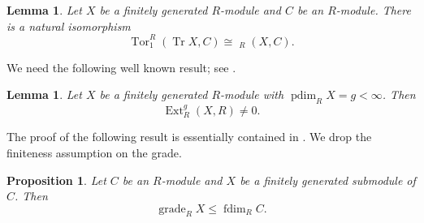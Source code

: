 \documentclass[a4paper,reqno]{amsart}
\numberwithin{equation}{section}
\theoremstyle{plain}
\newtheorem{prop}[thm]{Proposition}
\newtheorem{lem}[thm]{Lemma}
\theoremstyle{definition}
\theoremstyle{remark}
\DeclareMathOperator{\Ext}{Ext}
\DeclareMathOperator{\Tor}{Tor}
\DeclareMathOperator{\uHom}{\underline{Hom}}
\DeclareMathOperator{\grade}{grade}
\DeclareMathOperator{\pdim}{pdim}
\DeclareMathOperator{\fdim}{fdim}
\DeclareMathOperator{\Tr}{Tr}
\renewcommand{\-}{\mbox{-}}
\begin{document}
\begin{lem} \label{lem:abformula}
Let \(X\) be a finitely generated \(R\)-module and \(C\) be an \(R\)-module. 
There is a natural isomorphism
\begin{equation*}
    \Tor^R_1(\Tr X,C)\cong \uHom_R(X,C).
\end{equation*}
\end{lem}




We need the following well known result; see \cite[VI.5.5]{ARS95}.


\begin{lem} \label{lem:pdim}
    Let \(X\) be a finitely generated \(R\)-module with \(\pdim_RX=g<\infty\). Then
    \begin{equation*}
        \Ext^g_R(X,R)\neq 0.
    \end{equation*}
\end{lem}


The proof of the following result is essentially contained in \cite[Lemma 3.2]{KMT25}. 
We drop the finiteness assumption on the grade.



\begin{prop} \label{prop:grade-ineq}
    Let \(C\) be an \(R\)-module and \(X\) be a  finitely generated submodule of \(C\). 
    Then 
    \begin{equation*}
        \grade_RX\le \fdim_RC.
    \end{equation*}
\end{prop}
\end{document}
